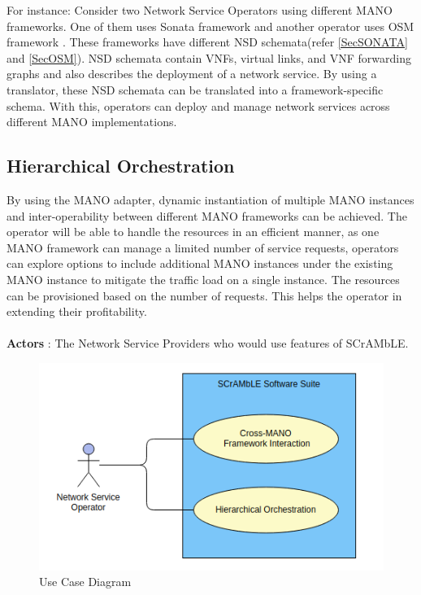 For instance: Consider two Network Service Operators using different MANO frameworks. One of them uses Sonata framework \cite{draxler2017sonata} and another operator uses OSM framework \cite{ersue2013etsi}. These frameworks have different NSD schemata(refer \ref{SecSONATA} and \ref{SecOSM}). NSD schemata contain VNFs, virtual links, and VNF forwarding graphs and also describes the deployment of a network service. By using a translator, these NSD schemata can be translated into a framework-specific schema. With this, operators can deploy and manage network services across different MANO implementations.

\subsection{Hierarchical Orchestration}
By using the MANO adapter, dynamic instantiation of multiple MANO instances and inter-operability between different MANO frameworks can be achieved. The operator will be able to handle the resources in an efficient manner, as one MANO framework can manage a limited number of service requests, operators can explore options to include additional MANO instances under the existing MANO instance to mitigate the traffic load on a single instance. The resources can be provisioned based on the number of requests. This helps the operator in extending their profitability.
\\
\\
\textbf{Actors} : The Network Service Providers who would use features of SCrAMbLE.

\begin{figure} [h]
	\centering
	\includegraphics[width=0.9\linewidth]{figures/use-case}
	\caption{Use Case Diagram}
	\label{fig:use-case}
\end{figure}





